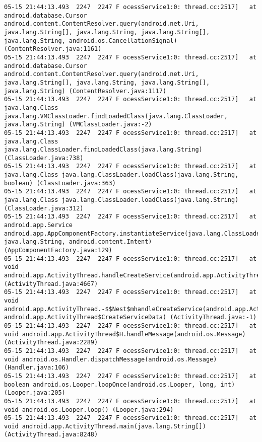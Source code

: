 \begin{lstlisting}
05-15 21:44:13.493  2247  2247 F ocessService1:0: thread.cc:2517]   at android.database.Cursor android.content.ContentResolver.query(android.net.Uri, java.lang.String[], java.lang.String, java.lang.String[], java.lang.String, android.os.CancellationSignal) (ContentResolver.java:1161)
05-15 21:44:13.493  2247  2247 F ocessService1:0: thread.cc:2517]   at android.database.Cursor android.content.ContentResolver.query(android.net.Uri, java.lang.String[], java.lang.String, java.lang.String[], java.lang.String) (ContentResolver.java:1117)
05-15 21:44:13.493  2247  2247 F ocessService1:0: thread.cc:2517]   at java.lang.Class java.lang.VMClassLoader.findLoadedClass(java.lang.ClassLoader, java.lang.String) (VMClassLoader.java:-2)
05-15 21:44:13.493  2247  2247 F ocessService1:0: thread.cc:2517]   at java.lang.Class java.lang.ClassLoader.findLoadedClass(java.lang.String) (ClassLoader.java:738)
05-15 21:44:13.493  2247  2247 F ocessService1:0: thread.cc:2517]   at java.lang.Class java.lang.ClassLoader.loadClass(java.lang.String, boolean) (ClassLoader.java:363)
05-15 21:44:13.493  2247  2247 F ocessService1:0: thread.cc:2517]   at java.lang.Class java.lang.ClassLoader.loadClass(java.lang.String) (ClassLoader.java:312)
05-15 21:44:13.493  2247  2247 F ocessService1:0: thread.cc:2517]   at android.app.Service android.app.AppComponentFactory.instantiateService(java.lang.ClassLoader, java.lang.String, android.content.Intent) (AppComponentFactory.java:129)
05-15 21:44:13.493  2247  2247 F ocessService1:0: thread.cc:2517]   at void android.app.ActivityThread.handleCreateService(android.app.ActivityThread$CreateServiceData) (ActivityThread.java:4667)
05-15 21:44:13.493  2247  2247 F ocessService1:0: thread.cc:2517]   at void android.app.ActivityThread.-$$Nest$mhandleCreateService(android.app.ActivityThread, android.app.ActivityThread$CreateServiceData) (ActivityThread.java:-1)
05-15 21:44:13.493  2247  2247 F ocessService1:0: thread.cc:2517]   at void android.app.ActivityThread$H.handleMessage(android.os.Message) (ActivityThread.java:2289)
05-15 21:44:13.493  2247  2247 F ocessService1:0: thread.cc:2517]   at void android.os.Handler.dispatchMessage(android.os.Message) (Handler.java:106)
05-15 21:44:13.493  2247  2247 F ocessService1:0: thread.cc:2517]   at boolean android.os.Looper.loopOnce(android.os.Looper, long, int) (Looper.java:205)
05-15 21:44:13.493  2247  2247 F ocessService1:0: thread.cc:2517]   at void android.os.Looper.loop() (Looper.java:294)
05-15 21:44:13.493  2247  2247 F ocessService1:0: thread.cc:2517]   at void android.app.ActivityThread.main(java.lang.String[]) (ActivityThread.java:8248)

\end{lstlisting}
